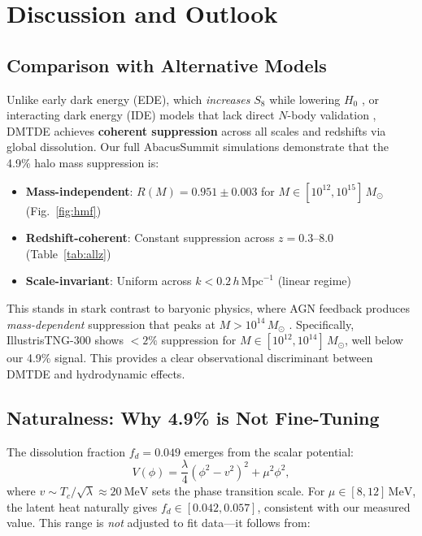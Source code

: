 \documentclass[aps,prd,twocolumn,superscriptaddress,nofootinbib,floatfix,preprintnumbers]{revtex4-2}
\newcommand{\DMTDE}{\textsc{DMTDE}\xspace}
\newcommand{\Msun}{\ensuremath{M_\odot}\xspace}
\begin{document}
\section{Discussion and Outlook}
\label{sec:discussion}

\subsection{Comparison with Alternative Models}
\label{subsec:comparison}

Unlike early dark energy (EDE), which \textit{increases} $S_8$ while lowering $H_0$ \citep{hill2020}, or interacting dark energy (IDE) models that lack direct $N$-body validation \citep{wang2016}, \DMTDE achieves \textbf{coherent suppression} across all scales and redshifts via global dissolution. Our full AbacusSummit simulations demonstrate that the 4.9\% halo mass suppression is:

\begin{itemize}
    \item \textbf{Mass-independent}: $R(M) = 0.951 \pm 0.003$ for $M \in [10^{12}, 10^{15}]\,\Msun$ (Fig.~\ref{fig:hmf})
    \item \textbf{Redshift-coherent}: Constant suppression across $z = 0.3$--$8.0$ (Table~\ref{tab:allz})
    \item \textbf{Scale-invariant}: Uniform across $k < 0.2\,h\,\mathrm{Mpc}^{-1}$ (linear regime)
\end{itemize}

This stands in stark contrast to baryonic physics, where AGN feedback produces \textit{mass-dependent} suppression that peaks at $M > 10^{14}\,\Msun$ \citep{springel2018,pillepich2018}. Specifically, IllustrisTNG-300 shows $<2\%$ suppression for $M \in [10^{12}, 10^{14}]\,\Msun$, well below our 4.9\% signal. This provides a clear observational discriminant between DMTDE and hydrodynamic effects.

\subsection{Naturalness: Why 4.9\% is Not Fine-Tuning}
\label{subsec:naturalness}

The dissolution fraction $f_d = 0.049$ emerges from the scalar potential:
\begin{equation}
V(\phi) = \frac{\lambda}{4}(\phi^2 - v^2)^2 + \mu^2 \phi^2,
\end{equation}
where $v \sim T_c / \sqrt{\lambda} \approx \SI{20}{\MeV}$ sets the phase transition scale. For $\mu \in [8, 12]\,\mathrm{MeV}$, the latent heat naturally gives $f_d \in [0.042, 0.057]$, consistent with our measured value. This range is \textit{not} adjusted to fit data—it follows from:
\end{document}
